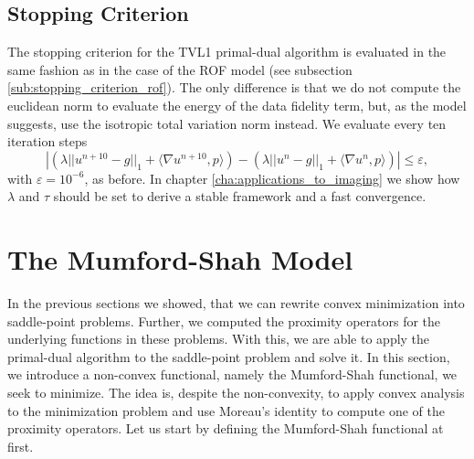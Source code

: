 \documentclass{scrreprt}
\begin{document}

        \subsection{Stopping Criterion} %
        \label{sub:stopping_criterion_tvl1}

            The stopping criterion for the TVL1 primal-dual algorithm is evaluated in the same fashion as in the case of the ROF model (see subsection \ref{sub:stopping_criterion_rof}). The only difference is that we do not compute the euclidean norm to evaluate the energy of the data fidelity term, but, as the model suggests, use the isotropic total variation norm instead. We evaluate every ten iteration steps
                \begin{equation}
                    \left| \left( \lambda ||u^{n+10} - g||_{1} + \langle \nabla u^{n+10}, p \rangle \right) - \left( \lambda ||u^{n} - g||_{1} + \langle \nabla u^{n}, p \rangle \right) \right| \le \varepsilon,
                    \label{eq:stop_tvl1_model}
                \end{equation}
            with $\varepsilon = 10^{-6}$, as before. In chapter \ref{cha:applications_to_imaging} we show how $\lambda$ and $\tau$ should be set to derive a stable framework and a fast convergence.



    \section{The Mumford-Shah Model} %
    \label{sec:the_mumford_shah_model}
        
        In the previous sections we showed, that we can rewrite convex minimization into saddle-point problems. Further, we computed the proximity operators for the underlying functions in these problems. With this, we are able to apply the primal-dual algorithm to the saddle-point problem and solve it. In this section, we introduce a non-convex functional, namely the Mumford-Shah functional, we seek to minimize. The idea is, despite the non-convexity, to apply convex analysis to the minimization problem and use Moreau's identity to compute one of the proximity operators. Let us start by defining the Mumford-Shah functional at first.
\end{document}
